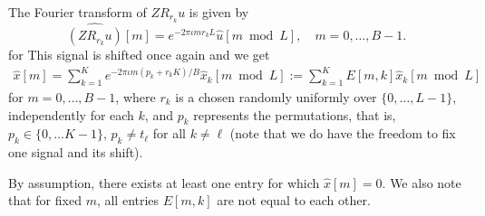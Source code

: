 \documentclass[english,12pt]{article}
\newcommand{\I}{\iota}
\newcommand{\C}{\mathbb{C}}
\newcommand{\hx}{\hat{x}}
\numberwithin{equation}{section}
\numberwithin{mytheorem}{section} %
\begin{document}
The Fourier transform of $ZR_{r_k}u$ is  given by 
\begin{equation}
\widehat{(ZR_{r_k}u)}[m] = e^{-2\pi\I m r_k L} \hat{u}[m\bmod L], \quad m=0,\ldots,B-1.
\end{equation}
for 
This signal is shifted once again and we get
\begin{eqnarray} \label{eq:Fourier_structure}
\hat{x}[m] = \sum_{k=1}^K e^{-2\pi\I m( p_k+r_k K)/B} \hat{x}_k[m \bmod L] := \sum_{k=1}^K E[m,k] \hat{x}_k[m \bmod L]
\end{eqnarray}
for $m=0,\ldots,B-1$, 
where $r_k$ is a chosen randomly uniformly over $\{0,\ldots,L-1\}$, independently for each $k$, and $p_k$ represents the permutations, that is, $p_k\in\{0,\ldots K-1\}$, $p_k\neq t_\ell$ for all $k\neq \ell$ (note that we do have the freedom to fix one signal and its shift). 

By assumption, there exists at least one entry for which
$\hx[m]=0$. We also note that for fixed $m$, all entries   
$E[m,k]$ are not equal to each other. 

\end{document}
